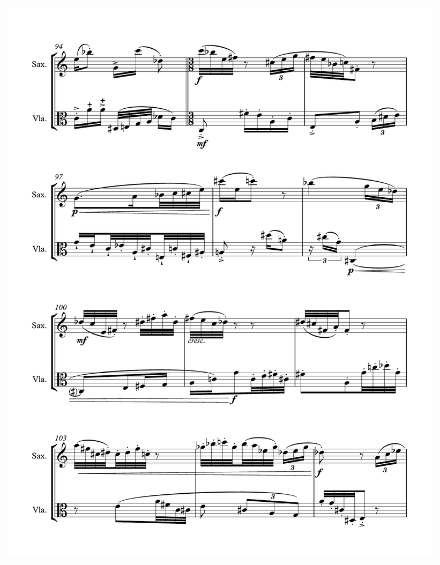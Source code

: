 \begin{figure}[htbp]
    \centering
	\includegraphics[width=6.5in]{figures/Sax_Viola_30.pdf}
\end{figure}


